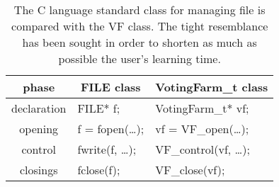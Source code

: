 \documentclass[11pt]{article}
\begin{document}
\vfill\eject

\begin{table}[h]
\begin{center}
\begin{tabular}{|c|l|l|}\hline
{\bf phase}&\multicolumn{1}{|c|}{\bf{\sf FILE} class}&\multicolumn{1}{|c|}{\bf{\sf VotingFarm\_t} class}\\ \hline
declaration & {\sf FILE* f;} & {\sf VotingFarm\_t* vf;}\\ \hline
opening & {\sf f = fopen(\ldots);} & {\sf vf = VF\_open(\ldots);}\\ \hline
control & {\sf fwrite(f, \ldots);} & {\sf VF\_control(vf, \ldots);}\\ \hline
closings & {\sf fclose(f);} & {\sf VF\_close(vf);}\\ \hline
\end{tabular}
\end{center}
\caption{The C language standard class for managing file is compared with
the VF class. The tight resemblance has been sought in order to shorten
as much as possible the user's learning time.}
\label{cmp}
\end{table}

\vfill\eject
\end{document}
